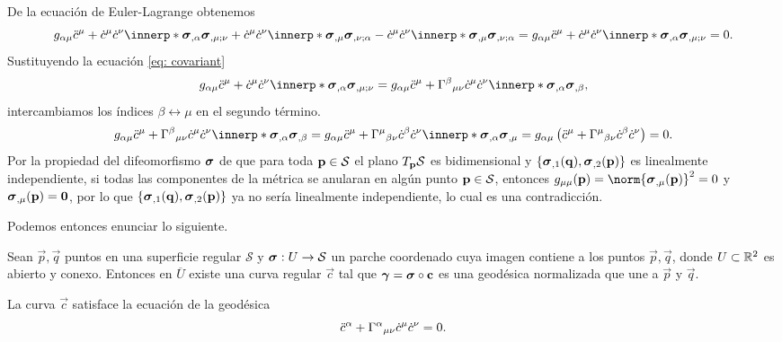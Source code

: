 De la ecuación de Euler-Lagrange obtenemos
\begin{equation}
	g_{\alpha\mu}\ddot c^\mu +  \dot c^\mu\dot c^\nu 
	\innerp*{\patch_{,\alpha}}{\patch_{,\mu; \nu} } + \dot c^\mu\dot c^\nu \innerp*{\patch_{,\mu}}{\patch_{,\nu; \alpha} } - \dot c^\mu \dot c^\nu \innerp*{\patch_{,\mu}}{\patch_{,\nu; \alpha}}
	= g_{\alpha\mu}\ddot c^\mu +  \dot c^\mu\dot c^\nu 
	\innerp*{\patch_{,\alpha}}{\patch_{,\mu; \nu} } = 0.
\end{equation}
Sustituyendo la ecuación \eqref{eq: covariant}
\begin{equation}
	 g_{\alpha\mu}\ddot c^\mu +  \dot c^\mu\dot c^\nu 
	\innerp*{\patch_{,\alpha}}{\patch_{,\mu; \nu} }
	=  g_{\alpha\mu}\ddot c^\mu +  \ChrisSym{\beta}{\mu\nu} \dot c^\mu\dot c^\nu 
	\innerp*{\patch_{,\alpha}}{\patch_{,\beta} },
\end{equation}
intercambiamos los índices $\beta \leftrightarrow \mu$ en el segundo término.
\begin{equation}
	 g_{\alpha\mu}\ddot c^\mu +  \ChrisSym{\beta}{\mu\nu} \dot c^\mu\dot c^\nu 
	\innerp*{\patch_{,\alpha}}{\patch_{,\beta} }
	= g_{\alpha\mu}\ddot c^\mu +  \ChrisSym{\mu}{\beta\nu} \dot c^\beta\dot c^\nu 
	\innerp*{\patch_{,\alpha}}{\patch_{,\mu} }
	= g_{\alpha\mu}\left( \ddot c^\mu +  \ChrisSym{\mu}{\beta\nu} \dot c^\beta\dot c^\nu  \right) = 0.
\end{equation}
Por la propiedad del difeomorfismo $\boldsymbol{\sigma}$ de que para toda $ \mathbf p \in \mathcal S$ el plano $T_{\mathbf p}\mathcal S$ es bidimensional y $\{\boldsymbol{\sigma}_{,1}(\mathbf q), \boldsymbol{\sigma}_{,2}(\mathbf p)\}$ es linealmente independiente, si todas las componentes de la métrica se anularan en algún punto $\mathbf p \in \mathcal S$, entonces $g_{\mu\mu}(\vec p) = \norm{\patch_{,\mu}(\vec p)}^2 = 0$ y $\boldsymbol{\sigma}_{,\mu}(\mathbf p) = \mathbf 0$, por lo que $\{\boldsymbol{\sigma}_{,1}(\mathbf q), \boldsymbol{\sigma}_{,2}(\mathbf p)\}$ ya no sería linealmente independiente, lo cual es una contradicción.

Podemos entonces enunciar lo siguiente.
\begin{theorem}
	Sean $\vec p, \vec q$ puntos en una superficie regular $\mathcal S$ y $\boldsymbol{\sigma} : U \to \mathcal S$ un parche coordenado cuya imagen contiene a los puntos $\vec p, \vec q$, donde $U \subset \mathbb R^2$ es abierto y conexo. Entonces en $\overline U$ existe una curva regular $\vec c$ tal que $\boldsymbol{\gamma} = \boldsymbol{\sigma} \circ \mathbf c$ es una geodésica normalizada que une a $\vec p$ y $\vec q$.
	
	La curva $\vec c$ satisface la ecuación de la geodésica
	\begin{equation}\label{eq: geodesicEq}
		\ddot c^\alpha +  {\Gamma^{\alpha}}_{\mu\nu} \dot c^\mu\dot c^\nu = 0.
	\end{equation}
\end{theorem}

